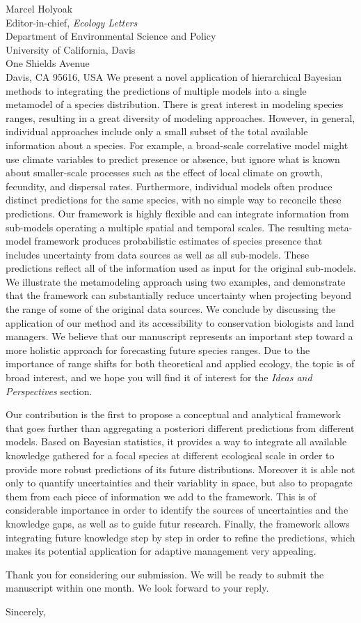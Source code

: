 \documentclass[11pt]{letter}
\makeatletter
\renewcommand{\closing}[1]{\par\nobreak\vspace{\parskip}%
  \stopbreaks
  \noindent
  \ifx\@empty\fromaddress\else
  \hspace*{\longindentation}\fi
  \parbox{\indentedwidth}{\raggedright
       \ignorespaces #1\\[1\medskipamount]%
       \ifx\@empty\fromsig
           \fromname
       \else \fromsig \fi\strut}%
   \par}
\makeatother
\begin{document}
\begin{letter}{Marcel Holyoak \\ 
	Editor-in-chief, \emph{Ecology Letters} \\ 
	Department of Environmental Science and Policy \\
	University of California, Davis \\
	One Shields Avenue \\
	Davis, CA 95616, USA }
We present a novel application of hierarchical Bayesian methods to integrating the predictions of multiple models into a single metamodel of a species distribution.
There is great interest in modeling species ranges, resulting in a great diversity of modeling approaches.
However, in general, individual approaches include only a small subset of the total available information about a species. 
For example, a broad-scale correlative model might use climate variables to predict presence or absence, but ignore what is known about smaller-scale processes such as the effect of local climate on growth, fecundity, and dispersal rates.
Furthermore, individual models often produce distinct predictions for the same species, with no simple way to reconcile these predictions.
Our framework is highly flexible and can integrate information from sub-models operating a multiple spatial and temporal scales.
The resulting meta-model framework produces probabilistic estimates of species presence that includes uncertainty from data sources as well as all sub-models.
 These predictions reflect all of the information used as input for the original sub-models.
We illustrate the metamodeling approach using two examples, and demonstrate that the framework can substantially reduce uncertainty when projecting beyond the range of some of the original data sources.
We conclude by discussing the application of our method and its accessibility to conservation biologists and land managers.
We believe that our manuscript represents an important step toward a more holistic approach for forecasting future species ranges.
Due to the importance of range shifts for both theoretical and applied ecology, the topic is of broad interest, and we hope you will find it of interest for the \emph{Ideas and Perspectives} section.

Our contribution is the first to propose a conceptual and analytical framework that goes further than aggregating a posteriori different predictions from different models. 
Based on Bayesian statistics, it provides a way to integrate all available knowledge gathered for a focal species at different ecological scale in order to provide more robust predictions of its future distributions.
Moreover it is able not only to quantify uncertainties and their variablity in space, but also to propagate them from each piece of information we add to the framework.
This is of considerable importance in order to identify the sources of uncertainties and the knowledge gaps, as well as to guide futur research.
Finally, the framework allows integrating future knowledge step by step in order to refine the predictions, which makes its potential application for adaptive management very appealing.

Thank you for considering our submission. We will be ready to submit the manuscript within one month. We look forward to your reply.

\closing{Sincerely,}

\end{letter}
\end{document}
